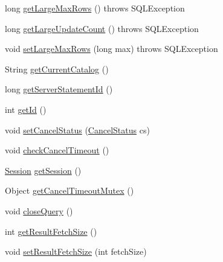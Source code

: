 \begin{DoxyCompactItemize}
\item 
long \mbox{\hyperlink{classcom_1_1mysql_1_1cj_1_1jdbc_1_1_statement_impl_a413626efa58d8aac8c72b36bb0ff4c33}{get\+Large\+Max\+Rows}} ()  throws S\+Q\+L\+Exception 
\item 
long \mbox{\hyperlink{classcom_1_1mysql_1_1cj_1_1jdbc_1_1_statement_impl_aeb27ff7e4f987d731094d20bf30fefad}{get\+Large\+Update\+Count}} ()  throws S\+Q\+L\+Exception 
\item 
void \mbox{\hyperlink{classcom_1_1mysql_1_1cj_1_1jdbc_1_1_statement_impl_adcb9676c5158982c94c3213a11feeb17}{set\+Large\+Max\+Rows}} (long max)  throws S\+Q\+L\+Exception 
\item 
String \mbox{\hyperlink{classcom_1_1mysql_1_1cj_1_1jdbc_1_1_statement_impl_af2b2cc49667c4ca719920667ed148629}{get\+Current\+Catalog}} ()
\item 
long \mbox{\hyperlink{classcom_1_1mysql_1_1cj_1_1jdbc_1_1_statement_impl_ae87860ea933fb4d96b255f57d5fa5580}{get\+Server\+Statement\+Id}} ()
\item 
int \mbox{\hyperlink{classcom_1_1mysql_1_1cj_1_1jdbc_1_1_statement_impl_a42a752f62a59215845a9faf514893dba}{get\+Id}} ()
\item 
void \mbox{\hyperlink{classcom_1_1mysql_1_1cj_1_1jdbc_1_1_statement_impl_aee9725a333800726518dc41fb794d1cc}{set\+Cancel\+Status}} (\mbox{\hyperlink{enumcom_1_1mysql_1_1cj_1_1_query_1_1_cancel_status}{Cancel\+Status}} cs)
\item 
void \mbox{\hyperlink{classcom_1_1mysql_1_1cj_1_1jdbc_1_1_statement_impl_a8409855892d4f4c55a35f3444f50825c}{check\+Cancel\+Timeout}} ()
\item 
\mbox{\hyperlink{interfacecom_1_1mysql_1_1cj_1_1_session}{Session}} \mbox{\hyperlink{classcom_1_1mysql_1_1cj_1_1jdbc_1_1_statement_impl_a9ff54c722b7738065d93da540326ffad}{get\+Session}} ()
\item 
Object \mbox{\hyperlink{classcom_1_1mysql_1_1cj_1_1jdbc_1_1_statement_impl_a428c7f909851189bed9fdc590ee2e770}{get\+Cancel\+Timeout\+Mutex}} ()
\item 
void \mbox{\hyperlink{classcom_1_1mysql_1_1cj_1_1jdbc_1_1_statement_impl_af05f123c5cf2cf971f7d5a8929b7c962}{close\+Query}} ()
\item 
int \mbox{\hyperlink{classcom_1_1mysql_1_1cj_1_1jdbc_1_1_statement_impl_a1c6f564765bab67e9f9330b362f930ca}{get\+Result\+Fetch\+Size}} ()
\item 
void \mbox{\hyperlink{classcom_1_1mysql_1_1cj_1_1jdbc_1_1_statement_impl_a54925c630ea2ab107815206f742e7be9}{set\+Result\+Fetch\+Size}} (int fetch\+Size)

\end{DoxyCompactItemize}
